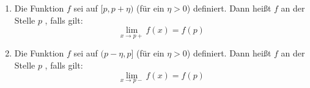 \begin{enumerate}
    \item Die Funktion $f$ sei auf $[p, p + \eta)$ (für ein $\eta > 0$) definiert. Dann heißt $f$ an der Stelle $p$ , falls gilt:
    $$\lim_{x \to p+} f(x) = f(p)$$
    \item Die Funktion $f$ sei auf $(p - \eta, p]$ (für ein $\eta > 0$) definiert. Dann heißt $f$ an der Stelle $p$ , falls gilt:
    $$\lim_{x \to p-} f(x) = f(p)$$
\end{enumerate}